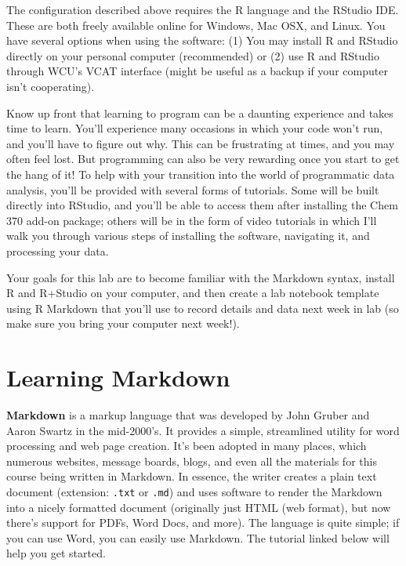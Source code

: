 \documentclass[]{tufte-book}
\begin{document}
The configuration described above requires the R language and the RStudio IDE. These are both freely available online for Windows, Mac OSX, and Linux. You have several options when using the software: (1) You may install R and RStudio directly on your personal computer (recommended) or (2) use R and RStudio through WCU's VCAT interface (might be useful as a backup if your computer isn't cooperating).

Know up front that learning to program can be a daunting experience and takes time to learn. You'll experience many occasions in which your code won't run, and you'll have to figure out why. This can be frustrating at times, and you may often feel lost. But programming can also be very rewarding once you start to get the hang of it! To help with your transition into the world of programmatic data analysis, you'll be provided with several forms of tutorials. Some will be built directly into RStudio, and you'll be able to access them after installing the Chem 370 add-on package; others will be in the form of video tutorials in which I'll walk you through various steps of installing the software, navigating it, and processing your data.

Your goals for this lab are to become familiar with the Markdown syntax, install R and R+Studio on your computer, and then create a lab notebook template using R Markdown that you'll use to record details and data next week in lab (so make sure you bring your computer next week!).

\hypertarget{learning-markdown}{%
\section*{Learning Markdown}\label{learning-markdown}}

\textbf{Markdown} is a markup language that was developed by John Gruber and Aaron Swartz in the mid-2000's. It provides a simple, streamlined utility for word processing and web page creation. It's been adopted in many places, which numerous websites, message boards, blogs, and even all the materials for this course being written in Markdown. In essence, the writer creates a plain text document (extension: \texttt{.txt} or \texttt{.md}) and uses software to render the Markdown into a nicely formatted document (originally just HTML (web format), but now there's support for PDFs, Word Docs, and more). The language is quite simple; if you can use Word, you can easily use Markdown. The tutorial linked below will help you get started.
\end{document}
